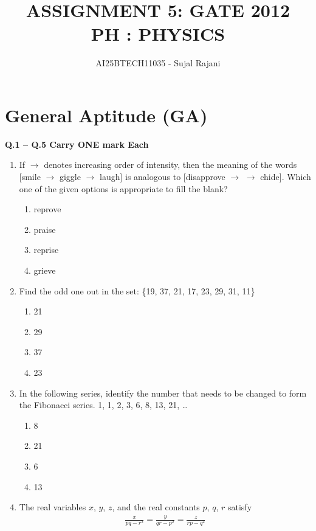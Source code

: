 \documentclass[journal,12pt,onecolumn]{IEEEtran}
\theoremstyle{remark}
\begin{document}
\title{
ASSIGNMENT 5: GATE 2012 \\
    PH : PHYSICS }
\author{AI25BTECH11035 - Sujal Rajani }
\maketitle
\renewcommand{\thefigure}{\theenumi}
\renewcommand{\thetable}{\theenumi}
\section*{\textbf{General Aptitude (GA)}}
\textbf{Q.1 -- Q.5 Carry ONE mark Each} 
\begin{enumerate}
\item If $\rightarrow$ denotes increasing order of intensity, then the meaning of the words
[smile $\rightarrow$ giggle $\rightarrow$ laugh] is analogous to [disapprove $\rightarrow$ \underline{\hspace*{2em}} $\rightarrow$ chide].
Which one of the given options is appropriate to fill the blank?
\begin{enumerate}
    \item reprove
    \item praise
    \item reprise
    \item grieve
\end{enumerate}


\item Find the odd one out in the set: \{19, 37, 21, 17, 23, 29, 31, 11\}
\begin{enumerate}
    \item 21
    \item 29
    \item 37
    \item 23
\end{enumerate}

\item In the following series, identify the number that needs to be changed to form the Fibonacci series.
\hspace*{2em}1, 1, 2, 3, 6, 8, 13, 21, \ldots
\begin{enumerate}
    \item 8
    \item 21
    \item 6
    \item 13
\end{enumerate}


\item The real variables $x$, $y$, $z$, and the real constants $p$, $q$, $r$ satisfy\\
\begin{align*}
    \frac{x}{pq - r^2} = \frac{y}{qr - p^2} = \frac{z}{rp - q^2}
\end{align*}


\end{enumerate}
\end{document}

